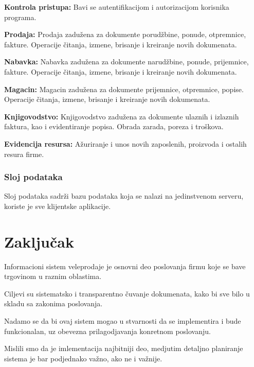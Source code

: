 \textbf{Kontrola pristupa:}
Bavi se autentifikacijom i autorizacijom korisnika programa.

\textbf{Prodaja:}
Prodaja zadužena za dokumente porudžbine, ponude, otpremnice, fakture. Operacije čitanja, izmene, brisanje i kreiranje novih dokumenata.

\textbf{Nabavka:}
Nabavka zadužena za dokumente narudžbine, ponude, prijemnice, fakture. Operacije čitanja, izmene, brisanje i kreiranje novih dokumenata.

\textbf{Magacin:}
Magacin zadužena za dokumente prijemnice, otpremnice, popise. Operacije čitanja, izmene, brisanje i kreiranje novih dokumenata.

\textbf{Knjigovodstvo:}
Knjigovodstvo zadužena za dokumente ulaznih i izlaznih faktura, kao i evidentiranje popisa. Obrada zarada, poreza i troškova.

\textbf{Evidencija resursa:}
Ažuriranje i unos novih zaposlenih, proizvoda i ostalih resura firme.

\subsubsection{Sloj podataka}

Sloj podataka sadrži bazu podataka koja se nalazi na jedinstvenom serveru, koriste je sve klijentske aplikacije.

\clearpage

\section{Zaključak}

Informacioni sistem veleprodaje je osnovni deo poslovanja firmu koje se bave trgovinom u raznim oblastima.

Ciljevi su sistematsko i transparentno čuvanje dokumenata, kako bi sve bilo u skladu sa zakonima poslovanja. 

Nadamo se da bi ovaj sistem mogao u stvarnosti da se implementira i bude funkcionalan, uz obevezna prilagodjavanja konretnom poslovanju.

Mislili smo da je imlementacija najbitniji deo, medjutim detaljno planiranje sistema je bar podjednako važno, ako ne i važnije.




